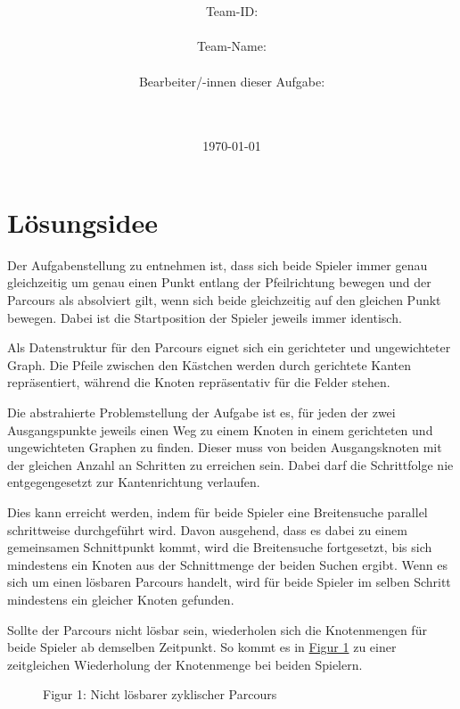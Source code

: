 \documentclass[a4paper,10pt,ngerman]{scrartcl}
\title{\textbf{\Huge\Aufgabe}}
\author{\LARGE Team-ID: \LARGE \TeamId \\\\
\LARGE Team-Name: \LARGE \TeamName \\\\
\LARGE Bearbeiter/-innen dieser Aufgabe: \\
\LARGE \Namen\\\\}
\date{\LARGE\today}
\begin{document}
    \maketitle
    \tableofcontents

    \vspace{0.5cm}


    \section{Lösungsidee}\label{sec:losungsidee}
    
    Der Aufgabenstellung zu entnehmen ist,
    dass sich beide Spieler immer genau gleichzeitig um genau einen Punkt entlang der Pfeilrichtung bewegen
    und der Parcours als absolviert gilt,
    wenn sich beide gleichzeitig auf den gleichen Punkt bewegen.
    Dabei ist die Startposition der Spieler jeweils immer identisch.

    Als Datenstruktur für den Parcours eignet sich ein gerichteter und ungewichteter Graph.
    Die Pfeile zwischen den Kästchen werden durch gerichtete Kanten repräsentiert,
    während die Knoten repräsentativ für die Felder stehen.

    Die abstrahierte Problemstellung der Aufgabe ist es,
    für jeden der zwei Ausgangspunkte jeweils einen Weg zu einem Knoten in einem gerichteten und ungewichteten Graphen zu finden.
    Dieser muss von beiden Ausgangsknoten mit der gleichen Anzahl an Schritten zu erreichen sein.
    Dabei darf die Schrittfolge nie entgegengesetzt zur Kantenrichtung verlaufen.

    Dies kann erreicht werden,
    indem für beide Spieler eine Breitensuche parallel schrittweise durchgeführt wird.
    Davon ausgehend, dass es dabei zu einem gemeinsamen Schnittpunkt kommt,
    wird die Breitensuche fortgesetzt,
    bis sich mindestens ein Knoten aus der Schnittmenge der beiden Suchen ergibt.
    Wenn es sich um einen lösbaren Parcours handelt,
    wird für beide Spieler im selben Schritt mindestens ein gleicher Knoten gefunden.

    Sollte der Parcours nicht lösbar sein,
    wiederholen sich die Knotenmengen
    für beide Spieler ab demselben Zeitpunkt.
    So kommt es in \hyperref[fig:Figure1]{Figur 1}
    zu einer zeitgleichen Wiederholung der Knotenmenge bei beiden Spielern.

    \begin{figure}
        \centering
        \FigurEins{}
        \caption{Figur 1: Nicht lösbarer zyklischer Parcours}
        \label{fig:Figure1}
    \end{figure}
\end{document}
